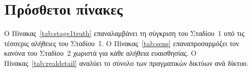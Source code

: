 \documentclass[11pt,a4paper]{article}
\theoremstyle{definition}
\theoremstyle{remark}
\begin{document}
\section{Πρόσθετοι πίνακες}
\label{app:tables}
Ο Πίνακας~\ref{tab:stage1truth} επαναλαμβάνει τη σύγκριση του Σταδίου~1 υπό τις τέσσερις αλήθειες του
Σταδίου~1. Ο Πίνακας~\ref{tab:sens} επαναπροσαρμόζει τον κανόνα του Σταδίου~2 χωριστά για κάθε αλήθεια
ευαισθησίας. Ο Πίνακας~\ref{tab:realdetail} αναλύει το σύνολο των πραγματικών δικτύων ανά δίκτυο.




\end{document}
